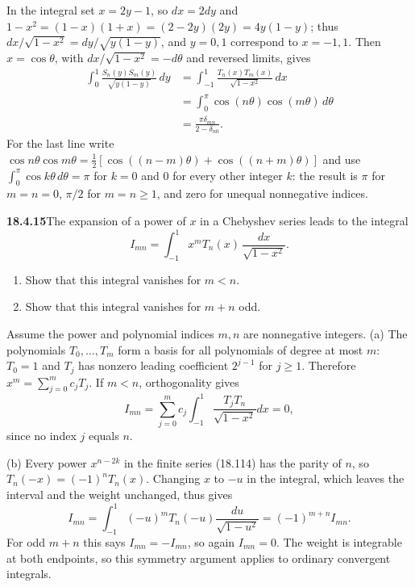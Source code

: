 In the integral set $x=2y-1$, so $dx=2dy$ and
$1-x^2=(1-x)(1+x)=(2-2y)(2y)=4y(1-y)$; thus
$dx/\sqrt{1-x^2}=dy/\sqrt{y(1-y)}$, and $y=0,1$ correspond to
$x=-1,1$.  Then $x=\cos\theta$, with $dx/\sqrt{1-x^2}=-d\theta$ and
reversed limits, gives
\begin{align*}
\int_0^1\frac{S_n(y)S_m(y)}{\sqrt{y(1-y)}}\,dy
 &=\int_{-1}^1\frac{T_n(x)T_m(x)}{\sqrt{1-x^2}}\,dx\\
 &=\int_0^\pi\cos(n\theta)\cos(m\theta)\,d\theta\\
 &=\boxed{\frac{\pi\delta_{mn}}{2-\delta_{n0}}}.
\end{align*}
For the last line write
$\cos n\theta\cos m\theta=\frac12[\cos((n-m)\theta)+\cos((n+m)\theta)]$
and use $\int_0^\pi\cos k\theta\,d\theta=\pi$ for $k=0$ and $0$ for
every other integer $k$: the result is $\pi$ for $m=n=0$, $\pi/2$ for
$m=n\ge1$, and zero for unequal nonnegative indices.

\par\bigskip
\noindent\textbf{18.4.15}\quad The expansion of a power of $x$ in a
Chebyshev series leads to the integral
\[
I_{mn}=\int_{-1}^{1}x^{m}T_{n}(x)\,\frac{dx}{\sqrt{1-x^{2}}}.
\]
\begin{enumerate}
\item[(a)] Show that this integral vanishes for $m<n$.
\item[(b)] Show that this integral vanishes for $m+n$ odd.
\end{enumerate}
\solution
Assume the power and polynomial indices $m,n$ are nonnegative integers.
(a) The polynomials $T_0,\ldots,T_m$ form a basis for all polynomials
of degree at most $m$: $T_0=1$ and $T_j$ has nonzero leading
coefficient $2^{j-1}$ for $j\ge1$.  Therefore
$x^m=\sum_{j=0}^m c_jT_j$.  If $m<n$, orthogonality gives
\[
I_{mn}=\sum_{j=0}^m c_j
 \int_{-1}^1\frac{T_jT_n}{\sqrt{1-x^2}}dx=\boxed{0},
\]
since no index $j$ equals $n$.

(b) Every power $x^{n-2k}$ in the finite series (18.114) has the
parity of $n$, so $T_n(-x)=(-1)^nT_n(x)$.
Changing $x$ to $-u$ in the integral, which leaves the interval and
the weight unchanged, thus gives
\[
I_{mn}=\int_{-1}^1(-u)^mT_n(-u)\frac{du}{\sqrt{1-u^2}}
 =(-1)^{m+n}I_{mn}.
\]
For odd $m+n$ this says
$I_{mn}=-I_{mn}$, so again $\boxed{I_{mn}=0}$.
The weight is integrable at both endpoints, so this symmetry
argument applies to ordinary convergent integrals.

